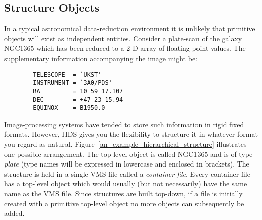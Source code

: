 \subsection {Structure Objects}

In a typical astronomical data-reduction environment it is unlikely that
primitive objects will exist as independent entities. Consider a plate-scan of
the galaxy NGC1365 which has been reduced to a 2-D array of floating point
values. The supplementary information accompanying the image might be:

\begin {verbatim}
        TELESCOPE  = `UKST'
        INSTRUMENT = `3A0/PDS'
        RA         = 10 59 17.107
        DEC        = +47 23 15.94
        EQUINOX    = B1950.0
\end{verbatim}

Image-processing systems have tended to store such information in rigid fixed
formats. However, HDS gives you the flexibility to structure it in whatever
format you regard as natural. Figure~\ref{an_example_hierarchical_structure}
illustrates one possible arrangement. The top-level object is called NGC1365
and is of type {\em plate} (type names will be expressed in lowercase and
enclosed in brackets). The structure is held in a single VMS file called a {\em
container file}. Every container file has a top-level object which would
usually (but not necessarily) have the same name as the VMS file. Since
structures are built top-down, if a file is initially created with a primitive
top-level object no more objects can subsequently be added.

